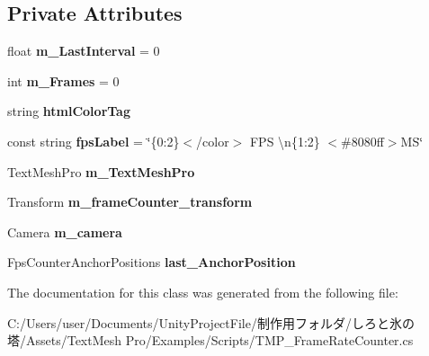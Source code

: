 \subsection*{Private Attributes}
\begin{DoxyCompactItemize}
\item 
\mbox{\label{class_t_m_pro_1_1_examples_1_1_t_m_p___frame_rate_counter_afcd5f6127ceb5620ccca5c3ce9b82c6c}} 
float {\bfseries m\+\_\+\+Last\+Interval} = 0
\item 
\mbox{\label{class_t_m_pro_1_1_examples_1_1_t_m_p___frame_rate_counter_a4d445f99bfb5528363429928cbe3c1a2}} 
int {\bfseries m\+\_\+\+Frames} = 0
\item 
\mbox{\label{class_t_m_pro_1_1_examples_1_1_t_m_p___frame_rate_counter_af14a680010f2de9ba5ee089cbe758ccf}} 
string {\bfseries html\+Color\+Tag}
\item 
\mbox{\label{class_t_m_pro_1_1_examples_1_1_t_m_p___frame_rate_counter_a6ebbaa72c5d2af277d9f87d7321429eb}} 
const string {\bfseries fps\+Label} = \char`\"{}\{0\+:2\}$<$/color$>$ F\+PS \textbackslash{}n\{1\+:2\} $<$\#8080ff$>$\+M\+S\char`\"{}
\item 
\mbox{\label{class_t_m_pro_1_1_examples_1_1_t_m_p___frame_rate_counter_ad4db98727cd1caf7a6bed4b08616df6a}} 
Text\+Mesh\+Pro {\bfseries m\+\_\+\+Text\+Mesh\+Pro}
\item 
\mbox{\label{class_t_m_pro_1_1_examples_1_1_t_m_p___frame_rate_counter_ae0f89bfbe75beb6de770d9f0de43ce2a}} 
Transform {\bfseries m\+\_\+frame\+Counter\+\_\+transform}
\item 
\mbox{\label{class_t_m_pro_1_1_examples_1_1_t_m_p___frame_rate_counter_a1a925b292ec5996f7810562d0d923963}} 
Camera {\bfseries m\+\_\+camera}
\item 
\mbox{\label{class_t_m_pro_1_1_examples_1_1_t_m_p___frame_rate_counter_a9be938044167c740406c482be80dd79c}} 
Fps\+Counter\+Anchor\+Positions {\bfseries last\+\_\+\+Anchor\+Position}
\end{DoxyCompactItemize}


The documentation for this class was generated from the following file\+:\begin{DoxyCompactItemize}
\item 
C\+:/\+Users/user/\+Documents/\+Unity\+Project\+File/制作用フォルダ/しろと氷の塔/\+Assets/\+Text\+Mesh Pro/\+Examples/\+Scripts/T\+M\+P\+\_\+\+Frame\+Rate\+Counter.\+cs\end{DoxyCompactItemize}
